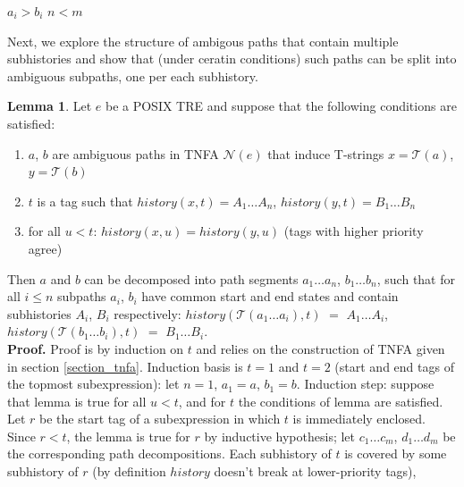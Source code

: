 \documentclass{article}
\newcommand{\Xeq}{\!=\!}
\newcommand{\XN}{\mathcal{N}}
\newcommand{\XT}{\mathcal{T}}
\theoremstyle{definition}
\newtheorem{XLem}{Lemma}
\begin{document}
\begin{multicols}{2}
    \begin{algorithm}[H] \DontPrintSemicolon {} 
     {
        \For {$i \Xeq \overline{1, min(n, m)}$} {
             {\Return $a_i \!>\! b_i$}
        }
        \Return $n \!<\! m$ \;
    }
    \end{algorithm}

Next, we explore the structure of ambigous paths that contain multiple subhistories
and show that (under ceratin conditions) such paths can be split into ambiguous subpaths,
one per each subhistory.

\begin{XLem}\label{lemma_path_decomposition}
Let $e$ be a POSIX TRE and suppose that the following conditions are satisfied:
\begin{enumerate}
    \item $a$, $b$ are ambiguous paths in TNFA $\XN(e)$ that induce T-strings $x \Xeq \XT(a)$, $y \Xeq \XT(b)$
    \item $t$ is a tag such that $history(x, t) \Xeq A_1 \dots A_n$, $history(y, t) \Xeq B_1 \dots B_n$
    \item for all $u \!<\! t$: $history(x, u) \Xeq history(y, u)$
        (tags with higher priority agree)
\end{enumerate}
Then $a$ and $b$ can be decomposed into path segments $a_1 \dots a_n$, $b_1 \dots b_n$,
such that for all $i \!\leq\! n$ subpaths $a_i$, $b_i$ have common start and end states and
contain subhistories $A_i$, $B_i$ respectively:
$history(\XT(a_1 \dots a_i), t)$ $\Xeq$ $A_1 \dots A_i$,
$history(\XT(b_1 \dots b_i), t)$ $\Xeq$ $B_1 \dots B_i$.
\\[0.5em]
\textbf{Proof.}
Proof is by induction on $t$ and relies on the construction of TNFA given in section \ref{section_tnfa}.
Induction basis is $t \Xeq 1$ and $t \Xeq 2$ (start and end tags of the topmost subexpression): let $n \Xeq 1$, $a_1 \Xeq a$, $b_1 \Xeq b$.
Induction step: suppose that lemma is true for all $u \!<\! t$,
and for $t$ the conditions of lemma are satisfied.
Let $r$ be the start tag of a subexpression in which $t$ is immediately enclosed.
Since $r \!<\! t$, the lemma is true for $r$ by inductive hypothesis;
let $c_1 \dots c_m$, $d_1 \dots d_m$ be the corresponding path decompositions.
Each subhistory of $t$ is covered by some subhistory of $r$ (by definition $history$ doesn't break at lower-priority tags),

\end{XLem}
\end{multicols}
\end{document}
